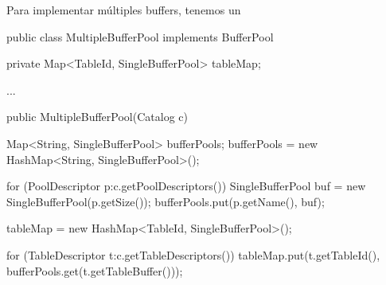 Para implementar múltiples buffers, tenemos un 

\begin{verbatimtab}[4]
public class MultipleBufferPool implements BufferPool
{
	private Map<TableId, SingleBufferPool> tableMap;

	...

	public MultipleBufferPool(Catalog c)
	{
		Map<String, SingleBufferPool> bufferPools;
		bufferPools = new HashMap<String, SingleBufferPool>();
		
		for (PoolDescriptor p:c.getPoolDescriptors())
		{
			SingleBufferPool buf = new SingleBufferPool(p.getSize());
			bufferPools.put(p.getName(), buf);
		}
		
		tableMap = new HashMap<TableId, SingleBufferPool>();
		
		for (TableDescriptor t:c.getTableDescriptors())
		{
			tableMap.put(t.getTableId(), bufferPools.get(t.getTableBuffer()));
		}
	}
}
\end{verbatimtab}
